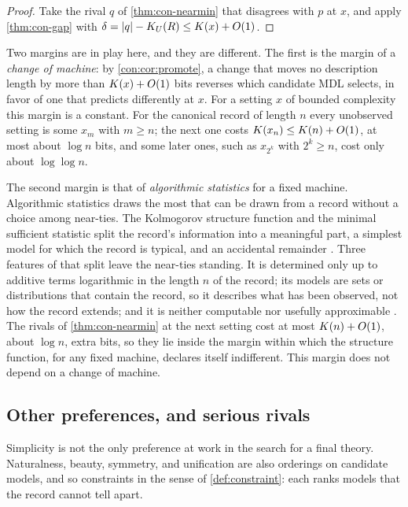 \begin{proof}
Take the rival $q$ of \cref{thm:con-nearmin} that disagrees with $p$ at $x$, and apply
\cref{thm:con-gap} with $\delta=|q|-K_{U}(R)\le K(x)+O(1)$.
\end{proof}

Two margins are in play here, and they are different. The first is the margin of a
\emph{change of machine}: by \cref{con:cor:promote}, a change that moves no description
length by more than $K(x)+O(1)$ bits reverses which candidate MDL selects, in favor of
one that predicts differently at $x$. For a setting $x$ of bounded complexity this
margin is a constant. For the canonical record of length $n$ every unobserved setting
is some $x_m$ with $m\ge n$; the next one costs $K(x_n)\le K(n)+O(1)$, at most about $\log n$
bits, and some later ones, such as $x_{2^k}$ with $2^k\ge n$, cost only about
$\log\log n$.

The second margin is that of \emph{algorithmic statistics} for a fixed machine.
Algorithmic statistics draws the most that can be drawn from a record without a choice
among near-ties. The Kolmogorov structure function and the minimal sufficient statistic
split the record's information into a meaningful part, a simplest model for which the
record is typical, and an accidental remainder
\citep{gacs2001,vereshchagin-vitanyi2004}. Three features of that split leave the
near-ties standing. It is determined only up to additive terms logarithmic in the
length $n$ of the record; its models are sets or distributions that contain the
record, so it describes what has been observed, not how the record extends; and it is
neither computable nor usefully approximable \citep[Sec.~VII]{vereshchagin-vitanyi2004}.
The rivals of \cref{thm:con-nearmin} at the next setting cost at most
$K(n)+O(1)$, about $\log n$, extra bits, so they lie inside the margin within which
the structure function, for any fixed machine, declares itself indifferent. This margin
does not depend on a change of machine.

\subsection{Other preferences, and serious rivals}

Simplicity is not the only preference at work in the search for a final theory.
Naturalness, beauty, symmetry, and unification are also orderings on candidate models,
and so constraints in the sense of \cref{def:constraint}: each ranks models that the
record cannot tell apart.

